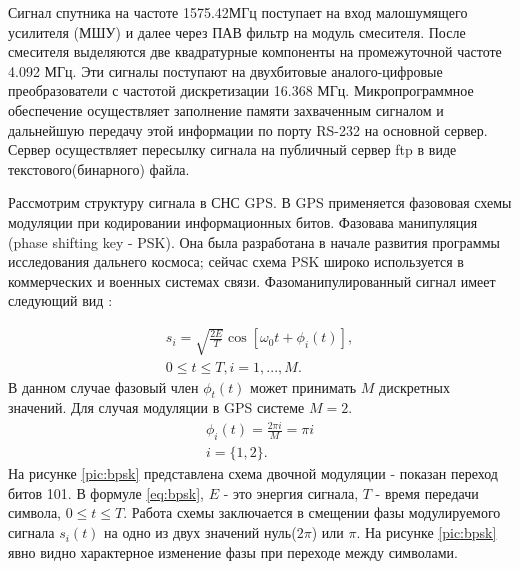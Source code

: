 \documentclass[a4paper,12pt]{article}
\numberwithin{table}{section}
\begin{document}
Сигнал спутника на частоте 1575.42МГц поступает на вход малошумящего усилителя (МШУ) и далее через ПАВ фильтр на модуль смесителя.
После смесителя выделяются две квадратурные компоненты на промежуточной частоте 4.092 МГц.
Эти сигналы поступают на двухбитовые аналого-цифровые преобразователи с частотой дискретизации 16.368 МГц.
Микропрограммное обеспечение осуществляет заполнение памяти захваченным сигналом и дальнейшую передачу этой информации
по порту RS-232 на основной сервер. Сервер осуществляет пересылку сигнала на публичный сервер ftp в виде текстового(бинарного) файла.

Рассмотрим структуру сигнала в СНС GPS. В GPS применяется фазововая схемы модуляции при кодировании информационных битов.
Фазовава манипуляция (phase shifting key - PSK).  Она была разработана  в начале развития программы исследования дальнего космоса;
сейчас схема PSK широко используется в коммерческих и военных системах связи. Фазоманипулированный сигнал имеет следующий вид \cite{sklyar}:

\begin{eqnarray}
s_i=\sqrt{\frac{2E}{T}}\cos{[{{\omega}_0}t + \phi_i(t)]}, \nonumber \\
	0\leq{t}\leq{T}, i = 1, ..., M.
\label{eq:bpsk}
\end{eqnarray}
В данном случае фазовый член ${\phi_t(t)}$ может принимать ${M}$ дискретных значений. Для случая модуляции в GPS системе ${M=2}$.
\begin{eqnarray}
	\phi_i(t)=\frac{2\pi{i}}{M}=\pi{i} \nonumber \\
	i = \{1,2\}.
\label{eq:bpsk_phi}
\end{eqnarray}
На рисунке \ref{pic:bpsk} представлена схема двочной модуляции - показан переход битов 101. В формуле \ref{eq:bpsk}, ${E}$ - это энергия
сигнала, ${T}$ - время передачи символа, ${0\leq{t}\leq{T}}$. Работа схемы заключается в смещении фазы модулируемого сигнала
${s_i(t)}$ на одно из двух значений нуль(${2\pi}$) или ${\pi}$. На рисунке \ref{pic:bpsk} явно видно характерное изменение фазы при 
переходе между символами.
\end{document}
